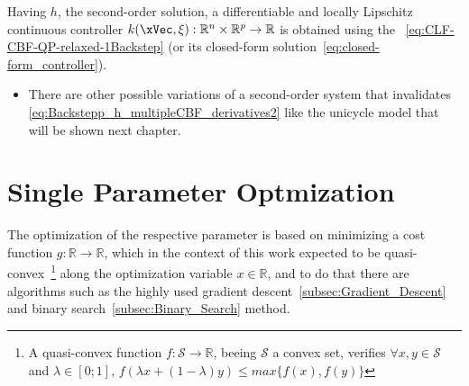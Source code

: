 Having  \(h\), the second-order solution, a differentiable and locally Lipschitz continuous controller \(k(\xVec, \mathbf{\xi}): \mathbb{R}^n \times \mathbb{R}^p \to \mathbb{R}\) is obtained using the ~\ref{eq:CLF-CBF-QP-relaxed-1Backstep} (or its closed-form solution~\ref{eq:closed-form_controller}). \\

\begin{tcolorbox}[colback=blue!5!white,colframe=blue!35!white,title=Notes:]
\begin{itemize}
    \item There are other possible variations of a second-order system that invalidates \ref{eq:Backstepp_h_multipleCBF_derivatives2} like the unicycle model that will be shown next chapter.
\end{itemize}
\end{tcolorbox} 



\newpage %




\section{Single Parameter Optmization}
\label{sec:Single_Parameter_Optmization}


The optimization of the respective parameter is based on minimizing a cost function \(g:\mathbb{R} \to \mathbb{R}\), which in the context of this work expected to be quasi-convex~\footnote{ A quasi-convex function \(f:\mathcal{S} \to \mathbb{R}\), beeing \(\mathcal{S}\) a convex set, verifies \(\forall x,y \in \mathcal{S}\) and \(\lambda \in [0;1]\), \(f(\lambda x + (1-\lambda)y) \leq max\{f(x), f(y)\}\)   } along the optimization variable \(x \in \mathbb{R}\), and to do that there are algorithms such as the highly used gradient descent~\ref{subsec:Gradient_Descent}  and binary search~\ref{subsec:Binary_Search} method.



